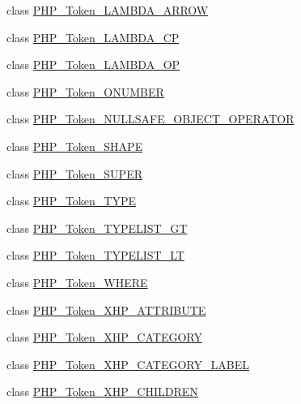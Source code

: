 \begin{DoxyCompactItemize}
\item 
class \mbox{\hyperlink{class_p_h_p___token___l_a_m_b_d_a___a_r_r_o_w}{P\+H\+P\+\_\+\+Token\+\_\+\+L\+A\+M\+B\+D\+A\+\_\+\+A\+R\+R\+OW}}
\item 
class \mbox{\hyperlink{class_p_h_p___token___l_a_m_b_d_a___c_p}{P\+H\+P\+\_\+\+Token\+\_\+\+L\+A\+M\+B\+D\+A\+\_\+\+CP}}
\item 
class \mbox{\hyperlink{class_p_h_p___token___l_a_m_b_d_a___o_p}{P\+H\+P\+\_\+\+Token\+\_\+\+L\+A\+M\+B\+D\+A\+\_\+\+OP}}
\item 
class \mbox{\hyperlink{class_p_h_p___token___o_n_u_m_b_e_r}{P\+H\+P\+\_\+\+Token\+\_\+\+O\+N\+U\+M\+B\+ER}}
\item 
class \mbox{\hyperlink{class_p_h_p___token___n_u_l_l_s_a_f_e___o_b_j_e_c_t___o_p_e_r_a_t_o_r}{P\+H\+P\+\_\+\+Token\+\_\+\+N\+U\+L\+L\+S\+A\+F\+E\+\_\+\+O\+B\+J\+E\+C\+T\+\_\+\+O\+P\+E\+R\+A\+T\+OR}}
\item 
class \mbox{\hyperlink{class_p_h_p___token___s_h_a_p_e}{P\+H\+P\+\_\+\+Token\+\_\+\+S\+H\+A\+PE}}
\item 
class \mbox{\hyperlink{class_p_h_p___token___s_u_p_e_r}{P\+H\+P\+\_\+\+Token\+\_\+\+S\+U\+P\+ER}}
\item 
class \mbox{\hyperlink{class_p_h_p___token___t_y_p_e}{P\+H\+P\+\_\+\+Token\+\_\+\+T\+Y\+PE}}
\item 
class \mbox{\hyperlink{class_p_h_p___token___t_y_p_e_l_i_s_t___g_t}{P\+H\+P\+\_\+\+Token\+\_\+\+T\+Y\+P\+E\+L\+I\+S\+T\+\_\+\+GT}}
\item 
class \mbox{\hyperlink{class_p_h_p___token___t_y_p_e_l_i_s_t___l_t}{P\+H\+P\+\_\+\+Token\+\_\+\+T\+Y\+P\+E\+L\+I\+S\+T\+\_\+\+LT}}
\item 
class \mbox{\hyperlink{class_p_h_p___token___w_h_e_r_e}{P\+H\+P\+\_\+\+Token\+\_\+\+W\+H\+E\+RE}}
\item 
class \mbox{\hyperlink{class_p_h_p___token___x_h_p___a_t_t_r_i_b_u_t_e}{P\+H\+P\+\_\+\+Token\+\_\+\+X\+H\+P\+\_\+\+A\+T\+T\+R\+I\+B\+U\+TE}}
\item 
class \mbox{\hyperlink{class_p_h_p___token___x_h_p___c_a_t_e_g_o_r_y}{P\+H\+P\+\_\+\+Token\+\_\+\+X\+H\+P\+\_\+\+C\+A\+T\+E\+G\+O\+RY}}
\item 
class \mbox{\hyperlink{class_p_h_p___token___x_h_p___c_a_t_e_g_o_r_y___l_a_b_e_l}{P\+H\+P\+\_\+\+Token\+\_\+\+X\+H\+P\+\_\+\+C\+A\+T\+E\+G\+O\+R\+Y\+\_\+\+L\+A\+B\+EL}}
\item 
class \mbox{\hyperlink{class_p_h_p___token___x_h_p___c_h_i_l_d_r_e_n}{P\+H\+P\+\_\+\+Token\+\_\+\+X\+H\+P\+\_\+\+C\+H\+I\+L\+D\+R\+EN}}

\end{DoxyCompactItemize}
